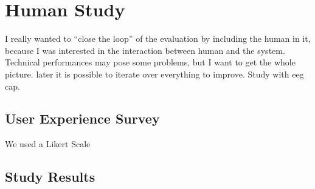 \chapter{Human Study}\label{ch:human_study}
I really wanted to ``close the loop'' of the evaluation by including the human in it, because I was interested in the interaction between human and the system.
Technical performances may pose some problems, but I want to get the whole picture.
later it is possible to iterate over everything to improve.
Study with eeg cap.
\section{User Experience Survey}
We used a Likert Scale \cite{likert1932technique}

\section{Study Results}
